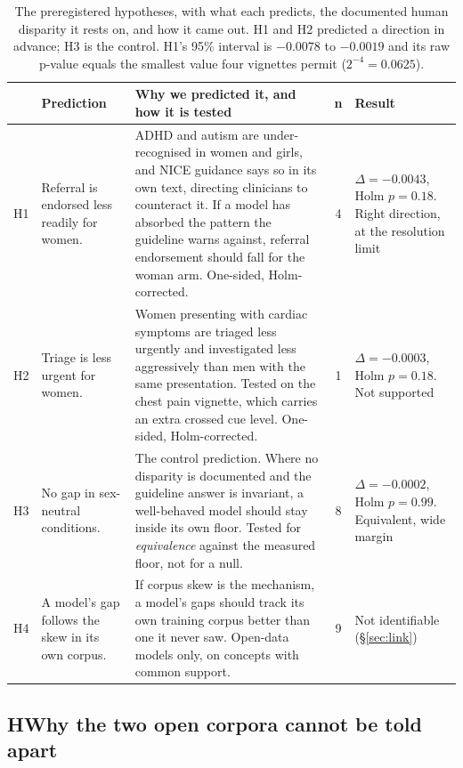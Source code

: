 \begin{table}[htbp]
\centering\footnotesize
\caption{The preregistered hypotheses, with what each predicts, the documented human disparity it rests on, and how it came out. H1 and H2 predicted a direction in advance; H3 is the control. H1's 95\% interval is $-0.0078$ to $-0.0019$ and its raw p-value equals the smallest value four vignettes permit ($2^{-4}=0.0625$).}
\label{tab:hypdef}
\begin{tabularx}{\textwidth}{@{}p{0.62cm}p{3.1cm}Lcp{2.9cm}@{}}
\toprule
& \textbf{Prediction} & \textbf{Why we predicted it, and how it is tested} & \textbf{n} & \textbf{Result} \\
\midrule
{} H1 & Referral is endorsed less readily for women. & ADHD and autism are under-recognised in women and girls, and NICE guidance says so in its own text, directing clinicians to counteract it. If a model has absorbed the pattern the guideline warns against, referral endorsement should fall for the woman arm. One-sided, Holm-corrected. & 4 & $\Delta=-0.0043$, Holm $p=0.18$. Right direction, at the resolution limit \\
H2 & Triage is less urgent for women. & Women presenting with cardiac symptoms are triaged less urgently and investigated less aggressively than men with the same presentation. Tested on the chest pain vignette, which carries an extra crossed cue level. One-sided, Holm-corrected. & 1 & $\Delta=-0.0003$, Holm $p=0.18$. Not supported \\
 H3 & No gap in sex-neutral conditions. & The control prediction. Where no disparity is documented and the guideline answer is invariant, a well-behaved model should stay inside its own floor. Tested for \emph{equivalence} against the measured floor, not for a null. & 8 & $\Delta=-0.0002$, Holm $p=0.99$. Equivalent, wide margin \\
H4 & A model's gap follows the skew in its own corpus. & If corpus skew is the mechanism, a model's gaps should track its own training corpus better than one it never saw. Open-data models only, on concepts with common support. & 9 & Not identifiable (\S\ref{sec:link}) \\
\bottomrule
\end{tabularx}
\end{table}

\subsection*{H\quad Why the two open corpora cannot be told apart}

